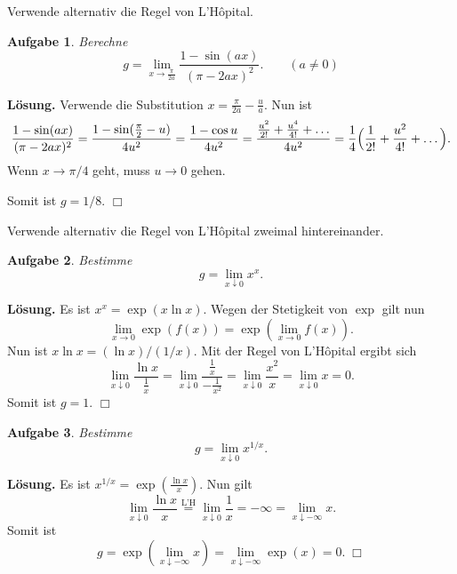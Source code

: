 \documentclass[a4paper,10pt,fleqn,twoside]{scrartcl}
\numberwithin{equation}{section}
\newcommand{\strong}[1]{{\normalfont\sffamily\bfseries #1}}
\theoremstyle{Aufgabe}
\newtheorem{Aufgabe}{\sffamily Aufgabe}[section]
\begin{document}
Verwende alternativ die Regel von L'Hôpital.

\begin{Aufgabe}
Berechne
\[g = \lim_{x\to\frac{\pi}{2a}} \frac{1-\sin(ax)}{(\pi-2ax)^2}.
\qquad(a\ne 0)\]
\end{Aufgabe}
\noindent
\strong{Lösung.}
Verwende die Substitution $x=\frac{\pi}{2a}-\frac{u}{a}$.
Nun ist
\[
\frac{1-\sin(ax)}{(\pi-2ax)^2}
= \frac{1-\sin(\frac{\pi}{2}-u)}{4u^2}
= \frac{1-\cos u}{4u^2}\\
= \frac{\frac{u^2}{2!}+\frac{u^4}{4!}+\ldots}{4u^2}
= \frac{1}{4} \Big(\frac{1}{2!}+\frac{u^2}{4!}+\ldots\Big).
\]
Wenn $x\to\pi/4$ geht, muss $u\to 0$ gehen.

Somit ist $g=1/8$. $\Box$

Verwende alternativ die Regel von L'Hôpital zweimal hintereinander.

\begin{Aufgabe}
Bestimme
\[g=\lim_{x\downarrow 0} x^x.\]
\end{Aufgabe}
\noindent
\strong{Lösung.} Es ist $x^x=\exp(x\ln x)$. Wegen der Stetigkeit von $\exp$
gilt nun
\[\lim_{x\to 0}\exp(f(x)) = \exp(\lim_{x\to 0} f(x)).\]
Nun ist $x\ln x = (\ln x)/(1/x).$
Mit der Regel von L'Hôpital ergibt sich
\[\lim_{x\downarrow 0} \frac{\ln x}{\frac{1}{x}}
= \lim_{x\downarrow 0} \frac{\frac{1}{x}}{-\frac{1}{x^2}}
= \lim_{x\downarrow 0}\frac{x^2}{x}
= \lim_{x\downarrow 0} x = 0.\]
Somit ist $g=1$. $\Box$

\begin{Aufgabe}
Bestimme
\[g=\lim_{x\downarrow 0} x^{1/x}.\]
\end{Aufgabe}
\noindent
\strong{Lösung.} Es ist $x^{1/x}=\exp(\frac{\ln x}{x})$.
Nun gilt
\[\lim_{x\downarrow 0}\frac{\ln x}{x}
\stackrel{\text{L'H}}= \lim_{x\downarrow 0}\frac{1}{x}
= -\infty = \lim_{x\downarrow -\infty} x.\]
Somit ist
\[g = \exp(\lim_{x\downarrow -\infty} x)
= \lim_{x\downarrow -\infty} \exp(x) = 0.\;\Box\]
\end{document}
